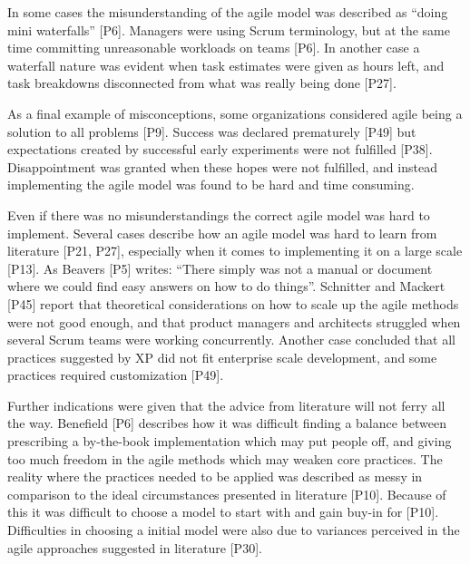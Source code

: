 In some cases the misunderstanding of the agile model was described as ``doing
mini waterfalls'' [P6]. Managers were using Scrum terminology, but at the same
time committing unreasonable workloads on teams [P6]. In another case a
waterfall nature was evident when task estimates were given as hours left, and
task breakdowns disconnected from what was really being done [P27].

As a final example of misconceptions, some organizations considered agile being
a solution to all problems [P9]. Success was declared prematurely [P49] but
expectations created by successful early experiments were not fulfilled [P38].
Disappointment was granted when these hopes were not fulfilled, and instead
implementing the agile model was found to be hard and time consuming.


Even if there was no misunderstandings the correct agile model was hard to
implement. Several cases describe how an agile model was hard to learn from
literature [P21, P27], especially when it comes to implementing it on a large
scale [P13]. As Beavers [P5] writes: ``There simply was not a manual or document
where we could find easy answers on how to do things''.
Schnitter and Mackert [P45] report that theoretical considerations on how to
scale up the agile methods were not good enough, and that product managers and
architects struggled when several Scrum teams were working concurrently.
Another case concluded that all practices suggested by XP did not fit enterprise
scale development, and some practices required customization [P49].


Further indications were given that the advice from literature will not ferry
all the way. Benefield [P6] describes how it was difficult finding a balance
between prescribing a by-the-book implementation which may put people off, and
giving too much freedom in the agile methods which may weaken core practices.
The reality where the practices needed to be applied was described as messy in
comparison to the ideal circumstances presented in literature [P10]. Because of
this it was difficult to choose a model to start with and gain buy-in for [P10].
Difficulties in choosing a initial model were also due to variances perceived in
the agile approaches suggested in literature [P30].

